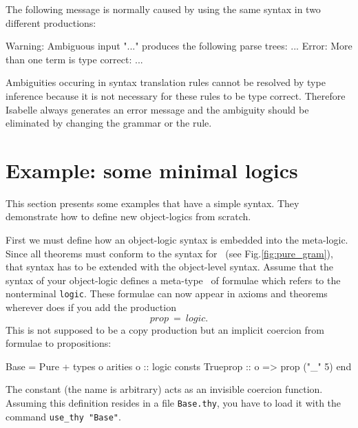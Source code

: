 The following message is normally caused by using the same
syntax in two different productions:

\begin{ttbox}
{\out Warning: Ambiguous input "..."}
{\out produces the following parse trees:}
{\out ...}
{\out Error: More than one term is type correct:}
{\out ...}
\end{ttbox}

Ambiguities occuring in syntax translation rules cannot be resolved by
type inference because it is not necessary for these rules to be type
correct.  Therefore Isabelle always generates an error message and the
ambiguity should be eliminated by changing the grammar or the rule.


\section{Example: some minimal logics} \label{sec:min_logics}

This section presents some examples that have a simple syntax.  They
demonstrate how to define new object-logics from scratch.

First we must define how an object-logic syntax is embedded into the
meta-logic.  Since all theorems must conform to the syntax for~
(see Fig.\ts\ref{fig:pure_gram}), that syntax has to be extended with the
object-level syntax.  Assume that the syntax of your object-logic defines a
meta-type~ of formulae which refers to the nonterminal {\tt logic}.
These formulae can now appear in axioms and theorems wherever  does
if you add the production
\[ prop ~=~ logic. \]
This is not supposed to be a copy production but an implicit coercion from
formulae to propositions:
\begin{ttbox}
Base = Pure +
types
  o
arities
  o :: logic
consts
  Trueprop :: o => prop   ("_" 5)
end
\end{ttbox}
The constant  (the name is arbitrary) acts as an invisible
coercion function.  Assuming this definition resides in a file {\tt Base.thy},
you have to load it with the command {\tt use_thy "Base"}.


